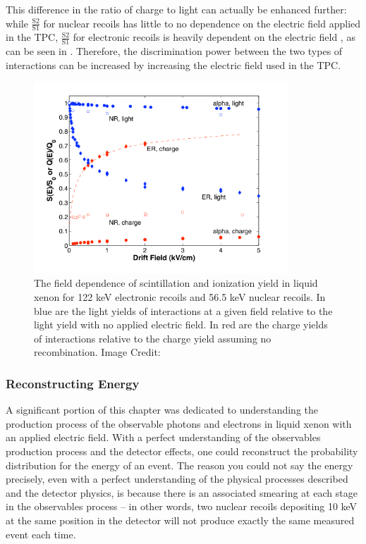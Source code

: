 This difference in the ratio of charge to light can actually be enhanced further: while $\frac{\textrm{S2}}{\textrm{S1}}$ for nuclear recoils has little to no dependence on the electric field applied in the TPC, $\frac{\textrm{S2}}{\textrm{S1}}$ for electronic recoils is heavily dependent on the electric field \cite{aprile2006simultaneous, goetzke2016measurement}, as can be seen in .  Therefore, the discrimination power between the two types of interactions can be increased by increasing the electric field used in the TPC.

\begin{figure}[t]
	\centering
	\includegraphics[width=0.85\textwidth]{field_dependence_nr_er}
	\caption{The field dependence of scintillation and ionization yield in liquid xenon for 122 keV electronic recoils and 56.5 keV nuclear recoils.  In blue are the light yields of interactions at a given field relative to the light yield with no applied electric field.  In red are the charge yields of interactions relative to the charge yield assuming no recombination.  Image Credit: }
	\label{fig:field_dependence_nr_er}
\end{figure}


\subsubsection{Reconstructing Energy}

A significant portion of this chapter was dedicated to understanding the production process of the observable photons and electrons in liquid xenon with an applied electric field.  With a perfect understanding of the observables production process and the detector effects, one could reconstruct the probability distribution for the energy of an event.  The reason you could not say the energy precisely, even with a perfect understanding of the physical processes described and the detector physics,  is because there is an associated smearing at each stage in the observables process -- in other words, two nuclear recoils depositing 10 keV at the same position in the detector will not produce exactly the same measured event each time.  

